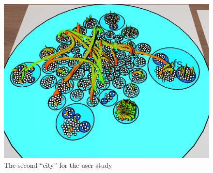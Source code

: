 \begin{figure}[htb]
  \centering
  \includegraphics[width=1\textwidth]{Evaluation/img/city_2.png}
  \caption{The second \enquote{\gls{city}} for the user study}\label{fig:city2}
\end{figure}

